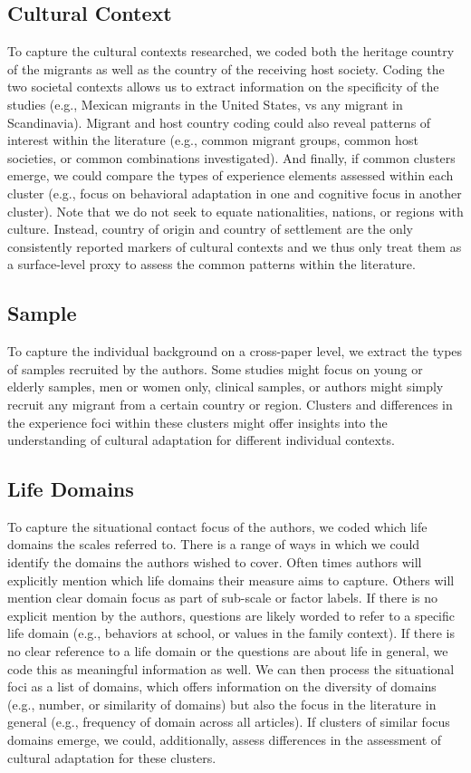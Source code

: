 \documentclass[man, 12pt, a4paper]{apa7}
\begin{document}
\subsection{Cultural Context}
To capture the cultural contexts researched, we coded both the heritage country of the migrants as well as the country of the receiving host society. Coding the two societal contexts allows us to extract information on the specificity of the studies (e.g., Mexican migrants in the United States, vs any migrant in Scandinavia). Migrant and host country coding could also reveal patterns of interest within the literature (e.g., common migrant groups, common host societies, or common combinations investigated). And finally, if common clusters emerge, we could compare the types of experience elements assessed within each cluster (e.g., focus on behavioral adaptation in one and cognitive focus in another cluster). Note that we do not seek to equate nationalities, nations, or regions with culture. Instead, country of origin and country of settlement are the only consistently reported markers of cultural contexts and we thus only treat them as a surface-level proxy to assess the common patterns within the literature.

\subsection{Sample}
To capture the individual background on a cross-paper level, we extract the types of samples recruited by the authors. Some studies might focus on young or elderly samples, men or women only, clinical samples, or authors might simply recruit any migrant from a certain country or region. Clusters and differences in the experience foci within these clusters might offer insights into the understanding of cultural adaptation for different individual contexts.

\subsection{Life Domains}
To capture the situational contact focus of the authors, we coded which life domains the scales referred to. There is a range of ways in which we could identify the domains the authors wished to cover. Often times authors will explicitly mention which life domains their measure aims to capture. Others will mention clear domain focus as part of sub-scale or factor labels. If there is no explicit mention by the authors, questions are likely worded to refer to a specific life domain (e.g., behaviors at school, or values in the family context). If there is no clear reference to a life domain or the questions are about life in general, we code this as meaningful information as well. We can then process the situational foci as a list of domains, which offers information on the diversity of domains (e.g., number, or similarity of domains) but also the focus in the literature in general (e.g., frequency of domain across all articles). If clusters of similar focus domains emerge, we could, additionally, assess differences in the assessment of cultural adaptation for these clusters.
\end{document}
